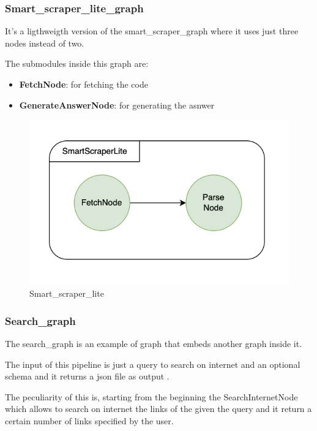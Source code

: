 \subsubsection{Smart\_scraper\_lite\_graph}
It's a ligthweigth version of the smart\_scraper\_graph where it uses just three nodes instead of two.

The submodules inside this graph are:

\begin{itemize}
    \item \textbf{FetchNode}: for fetching the code
    \item \textbf{GenerateAnswerNode}: for generating the asnwer
\end{itemize}

\begin{figure}[h!]
    \centering
    \includegraphics[width=0.5\linewidth]{Assets/smart_scraper_lite.png}
    \caption{Smart\_scraper\_lite}
    \label{fig:enter-label}
\end{figure}
\subsubsection{Search\_graph}
The search\_graph is an example of graph that embeds another graph inside it.

The input of this pipeline is just a query to search on internet and an optional schema and it returns a json file as output .

The peculiarity of this is, starting from the beginning the SearchInternetNode which allows to search on internet the links of the given the query and it return a certain number of links specified by the user.

